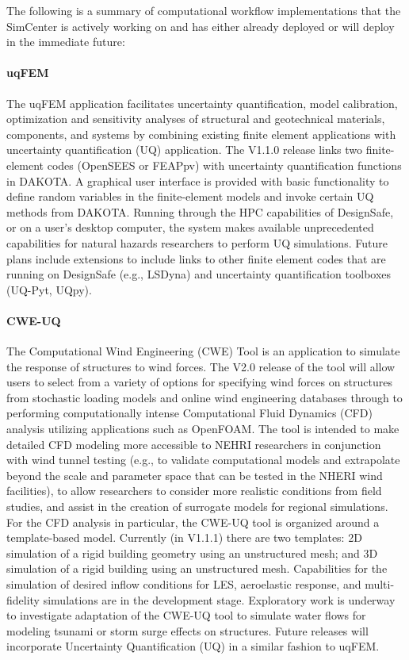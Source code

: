 The following is a summary of computational workflow implementations that the SimCenter is actively working on and has either already deployed or will deploy in the immediate future:

\paragraph{uqFEM} The uqFEM application facilitates uncertainty quantification, model calibration, optimization and sensitivity analyses of structural and geotechnical materials, components, and systems by combining existing finite element applications with uncertainty quantification (UQ) application. The V1.1.0 release links two finite-element codes (OpenSEES or FEAPpv) with uncertainty quantification functions in DAKOTA. A graphical user interface is provided with basic functionality to define random variables in the finite-element models and invoke certain UQ methods from DAKOTA. Running through the HPC capabilities of DesignSafe, or on a user's desktop computer, the system makes available unprecedented capabilities for natural hazards researchers to perform UQ simulations. Future plans include extensions to include links to other finite element codes that are running on DesignSafe (e.g., LSDyna) and uncertainty quantification toolboxes (UQ-Pyt, UQpy).

\paragraph{CWE-UQ} The Computational Wind Engineering (CWE) Tool is an application to simulate the response of structures to wind forces. The V2.0 release of the tool will allow users to select from a variety of options for specifying wind forces on structures from stochastic loading models and online wind engineering databases through to performing computationally intense Computational Fluid Dynamics (CFD) analysis utilizing applications such as OpenFOAM. The tool is intended to make detailed CFD modeling more accessible to NEHRI researchers in conjunction with wind tunnel testing (e.g., to validate computational models and extrapolate beyond the scale and parameter space that can be tested in the NHERI wind facilities), to allow researchers to consider more realistic conditions from field studies, and assist in the creation of surrogate models for regional simulations. For the CFD analysis in particular, the CWE-UQ tool is organized around a template-based model. Currently (in V1.1.1) there are two templates: 2D simulation of a rigid building geometry using an unstructured mesh; and 3D simulation of a rigid building using an unstructured mesh. Capabilities for the simulation of desired inflow conditions for LES, aeroelastic response, and multi-fidelity simulations are in the development stage. 
Exploratory work is underway to investigate adaptation of the CWE-UQ tool to simulate water flows for modeling tsunami or storm surge effects on structures. Future releases will incorporate Uncertainty Quantification (UQ) in a similar fashion to uqFEM.


